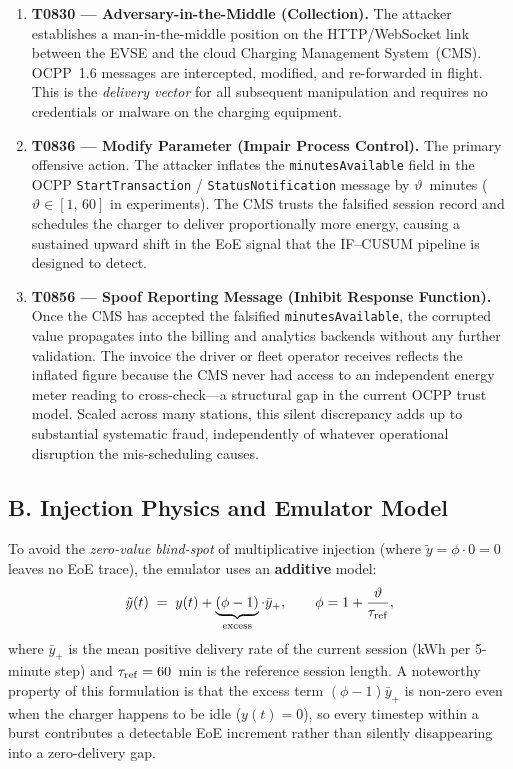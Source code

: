 \documentclass[journal]{IEEEtran}
\begin{document}
\begin{enumerate}
  \item \textbf{T0830 --- Adversary-in-the-Middle (Collection).}
    The attacker establishes a man-in-the-middle position on the
    HTTP/WebSocket link between the EVSE and the cloud Charging
    Management System~(CMS).
    OCPP~1.6 messages are intercepted, modified, and re-forwarded
    in flight.
    This is the \emph{delivery vector} for all subsequent manipulation
    and requires no credentials or malware on the charging equipment.

  \item \textbf{T0836 --- Modify Parameter (Impair Process Control).}
    The primary offensive action.
    The attacker inflates the \texttt{minutesAvailable} field in the
    OCPP \texttt{StartTransaction} / \texttt{StatusNotification} message
    by $\vartheta$~minutes ($\vartheta \in [1,\,60]$ in experiments).
    The CMS trusts the falsified session record and schedules the
    charger to deliver proportionally more energy, causing a sustained
    upward shift in the EoE signal that the IF--CUSUM pipeline is
    designed to detect.

  \item \textbf{T0856 --- Spoof Reporting Message (Inhibit Response
    Function).}
    Once the CMS has accepted the falsified \texttt{minutesAvailable},
    the corrupted value propagates into the billing and analytics
    backends without any further validation.
    The invoice the driver or fleet operator receives reflects the
    inflated figure because the CMS never had access to an independent
    energy meter reading to cross-check---a structural gap in the
    current OCPP trust model.
    Scaled across many stations, this silent discrepancy adds up
    to substantial systematic fraud, independently of whatever
    operational disruption the mis-scheduling causes.
\end{enumerate}

\subsection*{B.\; Injection Physics and Emulator Model}

To avoid the \emph{zero-value blind-spot} of multiplicative injection
(where $\tilde{y}=\phi\cdot 0 = 0$ leaves no EoE trace), the emulator
uses an \textbf{additive} model:
\begin{equation}
  \tilde{y}(t) \;=\; y(t) + \underbrace{(\phi - 1)}_{\text{excess}}
  \cdot \bar{y}_{+},
  \qquad \phi = 1 + \frac{\vartheta}{\tau_{\rm ref}},
  \label{eq:additive}
\end{equation}
where $\bar{y}_{+}$ is the mean positive delivery rate of the current
session (kWh per 5-minute step) and
$\tau_{\rm ref} = 60$~min is the reference session length.
A noteworthy property of this formulation is that the excess term
$(\phi-1)\bar{y}_{+}$ is non-zero even when the charger happens to
be idle ($y(t)=0$), so every timestep within a burst contributes
a detectable EoE increment rather than silently disappearing into
a zero-delivery gap.
\end{document}

